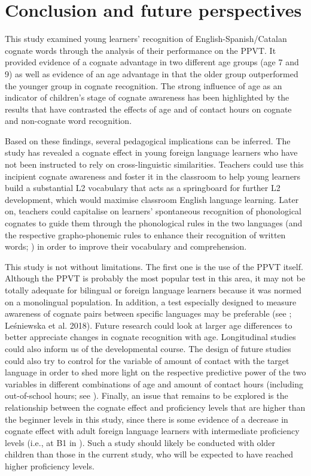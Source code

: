 \documentclass[output=paper,modfonts,nonflat,newtxmath]{langsci/langscibook}
\begin{document}
\section{{Conclusion} \textbf{and} \textbf{future} \textbf{perspectives}}

{This study examined young learners’ recognition of English-Spanish/Catalan cognate words through the analysis of their performance on the PPVT. It provided evidence of a cognate advantage in two different age groups (age 7 and 9) as well as evidence of an age advantage in that the older group outperformed the younger group in cognate recognition. The strong influence of age as an indicator of children’s stage of cognate awareness has been highlighted by the results that have contrasted the effects of age and of contact hours on cognate and non-cognate word recognition.}

 {Based on these findings, several pedagogical implications can be inferred. The study has revealed a cognate effect in young foreign language learners who have not been instructed to rely on cross-linguistic similarities. Teachers could use this incipient cognate awareness and foster it in the classroom to help young learners build a substantial L2 vocabulary that acts as a springboard for further L2 development, which would maximise classroom English language learning. Later on, teachers could capitalise on learners’ spontaneous recognition of phonological cognates to guide them through the phonological rules in the two languages (and the respective grapho-phonemic rules to enhance their recognition of written words; \citealt{LázaroIbarrola2010}) in order to improve their vocabulary and comprehension.}

 {This study is not without limitations. The first one is the use of the PPVT itself. Although the PPVT is probably the most popular test in this area, it may not be totally adequate for bilingual or foreign language learners because it was normed on a monolingual population. In addition, a test especially designed to measure awareness of cognate pairs between specific languages may be preferable (see \citealt{GoriotEtAl2018}; Leśniewska et al. 2018). Future research could look at larger age differences to better appreciate changes in cognate recognition with age. Longitudinal studies could also inform us of the developmental course. The design of future studies could also try to control for the variable of amount of contact with the target language in order to shed more light on the respective predictive power of the two variables in different combinations of age and amount of contact hours (including out-of-school hours; see \citealt{MuñozEtAl2018}).  Finally, an issue that remains to be explored is the relationship between the cognate effect and proficiency levels that are higher than the beginner levels in this study, since there is some evidence of a decrease in cognate effect with adult foreign language learners with intermediate proficiency levels (i.e., at B1 in \citealt{CasaponsaEtAl2015}). Such a study should likely be conducted with older children than those in the current study, who will be expected to have reached higher proficiency levels.}
\end{document}
